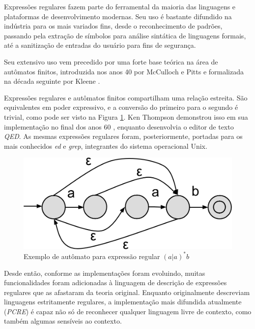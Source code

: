 \documentclass[a4paper,12pt,oneside,onecolumn]{uerj}
\begin{document}
Expressões regulares fazem parte do ferramental da maioria das linguagens e plataformas de desenvolvimento modernas. Seu uso é bastante difundido na indústria para os mais variados fins, desde o reconhecimento de padrões, passando pela extração de símbolos para análise sintática de linguagens formais, até a sanitização de entradas do usuário para fins de segurança.

Seu extensivo uso vem precedido por uma forte base teórica na área de autômatos finitos, introduzida nos anos 40 por McCulloch e Pitts \cite{bib:McCulloch43} e formalizada na década seguinte por Kleene \cite{bib:Kleene56}.

Expressões regulares e autômatos finitos compartilham uma relação estreita. São equivalentes em poder expressivo, e a conversão do primeiro para o segundo é trivial, como pode ser visto na Figura \ref{fig:exemplo_automato}. Ken Thompson demonstrou isso em sua implementação no final dos anos 60 \cite{bib:Thompson68}, enquanto desenvolvia o editor de texto \emph{QED}. As mesmas expressões regulares foram, posteriormente, portadas para os mais conhecidos \emph{ed} e \emph{grep}, integrantes do sistema operacional Unix.

\begin{figure}[!htbp]
  \centering
  \includegraphics[scale=0.3]{figures/exemplo_automato.png}
  \caption{Exemplo de autômato para expressão regular $(a|a)^*b$}
  \label{fig:exemplo_automato}
\end{figure}

Desde então, conforme as implementações foram evoluindo, muitas funcionalidades foram adicionadas à linguagem de descrição de expressões regulares que as afastaram da teoria original. Enquanto originalmente descreviam linguagens estritamente regulares, a implementação mais difundida atualmente (\emph{PCRE}) é capaz não só de reconhecer qualquer linguagem livre de contexto, como também algumas sensíveis ao contexto. \cite{bib:Nikita12}
\end{document}
